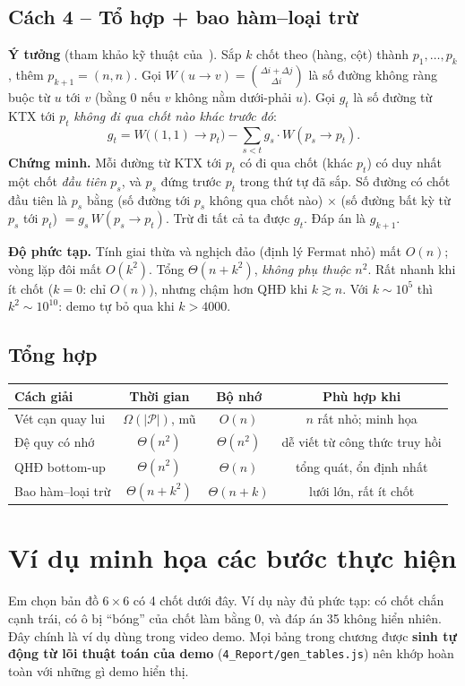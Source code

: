 \documentclass[12pt,a4paper]{report}
\begin{document}
\section{Cách 4 -- Tổ hợp + bao hàm--loại trừ}
\textbf{Ý tưởng} (tham khảo kỹ thuật của~\cite{cf559c}). Sắp $k$ chốt theo (hàng, cột) thành $p_1,\dots,p_k$, thêm $p_{k+1}=(n,n)$. Gọi $W(u\to v)=\binom{\Delta i+\Delta j}{\Delta i}$ là số đường không ràng buộc từ $u$ tới $v$ (bằng 0 nếu $v$ không nằm dưới-phải $u$). Gọi $g_t$ là số đường từ KTX tới $p_t$ \emph{không đi qua chốt nào khác trước đó}:
\[ g_t = W\big((1,1)\to p_t\big) - \sum_{s<t} g_s\cdot W(p_s\to p_t). \]
\textbf{Chứng minh.} Mỗi đường từ KTX tới $p_t$ có đi qua chốt (khác $p_t$) có duy nhất một chốt \emph{đầu tiên} $p_s$, và $p_s$ đứng trước $p_t$ trong thứ tự đã sắp. Số đường có chốt đầu tiên là $p_s$ bằng (số đường tới $p_s$ không qua chốt nào) $\times$ (số đường bất kỳ từ $p_s$ tới $p_t$) $= g_s\,W(p_s\to p_t)$. Trừ đi tất cả ta được $g_t$. Đáp án là $g_{k+1}$.

\textbf{Độ phức tạp.} Tính giai thừa và nghịch đảo (định lý Fermat nhỏ) mất $O(n)$; vòng lặp đôi mất $O(k^2)$. Tổng $\Theta(n+k^2)$, \emph{không phụ thuộc $n^2$}. Rất nhanh khi ít chốt ($k=0$: chỉ $O(n)$), nhưng chậm hơn QHĐ khi $k \gtrsim n$. Với $k\sim 10^5$ thì $k^2\sim 10^{10}$: demo tự bỏ qua khi $k>4000$.

\section{Tổng hợp}
\begin{center}
\begin{tabular}{lccc}
\toprule
\textbf{Cách giải} & \textbf{Thời gian} & \textbf{Bộ nhớ} & \textbf{Phù hợp khi}\\\midrule
Vét cạn quay lui & $\Omega(|\mathcal P|)$, mũ & $O(n)$ & $n$ rất nhỏ; minh họa \\
Đệ quy có nhớ & $\Theta(n^2)$ & $\Theta(n^2)$ & dễ viết từ công thức truy hồi \\
QHĐ bottom-up & $\Theta(n^2)$ & $\Theta(n)$ & tổng quát, ổn định nhất \\
Bao hàm--loại trừ & $\Theta(n+k^2)$ & $\Theta(n+k)$ & lưới lớn, rất ít chốt \\
\bottomrule
\end{tabular}
\end{center}

\chapter{Ví dụ minh họa các bước thực hiện}
Em chọn bản đồ $6\times6$ có 4 chốt dưới đây. Ví dụ này đủ phức tạp: có chốt chắn cạnh trái, có ô bị ``bóng'' của chốt làm bằng 0, và đáp án 35 không hiển nhiên. Đây chính là ví dụ dùng trong video demo. Mọi bảng trong chương được \textbf{sinh tự động từ lõi thuật toán của demo} (\texttt{4\_Report/gen\_tables.js}) nên khớp hoàn toàn với những gì demo hiển thị.
\end{document}
